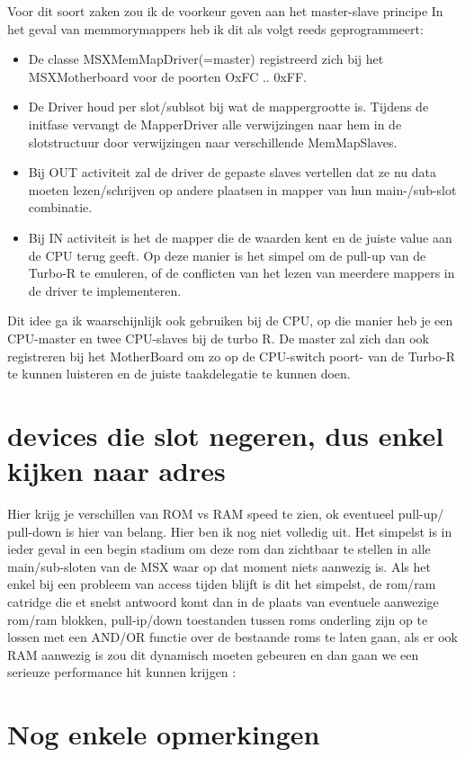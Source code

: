 \documentclass[11pt, a4paper]{report}
\begin{document}
Voor dit soort zaken zou ik de voorkeur geven aan het master-slave principe
In het geval van memmorymappers heb ik dit als volgt reeds geprogrammeert:
\begin{itemize}
\item De classe MSXMemMapDriver(=master) registreerd zich bij het MSXMotherboard voor de 
poorten OxFC .. 0xFF.
\item De Driver houd per slot/sublsot bij wat de mappergrootte is. Tijdens de initfase
vervangt de MapperDriver alle verwijzingen naar hem in de slotstructuur door verwijzingen 
naar verschillende MemMapSlaves.
\item Bij OUT activiteit zal de driver de gepaste slaves vertellen dat ze nu data moeten 
lezen/schrijven op andere plaatsen in mapper van hun main-/sub-slot combinatie.
\item Bij IN activiteit is het de mapper die de waarden kent en de juiste value aan de
CPU terug geeft. Op deze manier is het simpel om de pull-up van de Turbo-R te
emuleren, of de conflicten van het lezen van meerdere mappers in de driver te 
implementeren.
\end{itemize}

Dit idee ga ik waarschijnlijk ook gebruiken bij de CPU, op die manier heb je een 
CPU-master en twee CPU-slaves bij de turbo R. De master zal zich dan ook registreren 
bij het MotherBoard om zo op de CPU-switch poort- van de Turbo-R te kunnen luisteren 
en de juiste taakdelegatie te kunnen doen.


\section {devices die slot negeren, dus enkel kijken naar adres}

Hier krijg je verschillen van ROM vs RAM speed te  zien, ok eventueel pull-up/ pull-down
is hier van belang. Hier ben ik nog niet volledig uit. Het simpelst is in ieder geval in
een begin stadium om deze rom dan zichtbaar te stellen in alle main/sub-sloten van de MSX
waar op dat moment niets aanwezig is. Als het enkel bij een probleem van access tijden
blijft is dit het simpelst, de rom/ram catridge die et snelst antwoord komt dan in de
plaats van eventuele aanwezige rom/ram blokken, pull-ip/down toestanden tussen roms
onderling zijn op te lossen met een AND/OR functie over de bestaande roms te laten gaan,
als er ook RAM aanwezig is zou dit dynamisch moeten gebeuren en dan gaan we een serieuze
performance hit kunnen krijgen :\


\section{Nog enkele opmerkingen}
\end{document}
